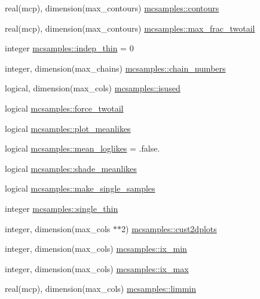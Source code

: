 \begin{DoxyCompactItemize}
real(mcp), dimension(max\+\_\+contours) \mbox{\hyperlink{namespacemcsamples_ae745525f8fef6e02d22826cd2a5f1bcc}{mcsamples\+::contours}}
\item 
real(mcp), dimension(max\+\_\+contours) \mbox{\hyperlink{namespacemcsamples_a1db866dfd553051fc5cbd2c80bcd4c86}{mcsamples\+::max\+\_\+frac\+\_\+twotail}}
\item 
integer \mbox{\hyperlink{namespacemcsamples_a562ce4b67831be4911c45a4e08a6ef18}{mcsamples\+::indep\+\_\+thin}} = 0
\item 
integer, dimension(max\+\_\+chains) \mbox{\hyperlink{namespacemcsamples_a619b6da70c38ede6a9851a3ee89b4019}{mcsamples\+::chain\+\_\+numbers}}
\item 
logical, dimension(max\+\_\+cols) \mbox{\hyperlink{namespacemcsamples_a6269903cd9674bdcc7c4527acdddfef3}{mcsamples\+::isused}}
\item 
logical \mbox{\hyperlink{namespacemcsamples_a5bf85772fb62752a789a1d253bd6cd5a}{mcsamples\+::force\+\_\+twotail}}
\item 
logical \mbox{\hyperlink{namespacemcsamples_a68c0597751197a26086066ed961e47ef}{mcsamples\+::plot\+\_\+meanlikes}}
\item 
logical \mbox{\hyperlink{namespacemcsamples_a42f921b7349e79466c2128ebcb06e75f}{mcsamples\+::mean\+\_\+loglikes}} = .false.
\item 
logical \mbox{\hyperlink{namespacemcsamples_ad55967ca18b8319069920d6d1e772bb1}{mcsamples\+::shade\+\_\+meanlikes}}
\item 
logical \mbox{\hyperlink{namespacemcsamples_ad8e59e2a5de71cff7f1241b59b058291}{mcsamples\+::make\+\_\+single\+\_\+samples}}
\item 
integer \mbox{\hyperlink{namespacemcsamples_a39de2461adb48b31033a95a7d14666be}{mcsamples\+::single\+\_\+thin}}
\item 
integer, dimension(max\+\_\+cols $\ast$$\ast$2) \mbox{\hyperlink{namespacemcsamples_a1831bdf8091941b6ccbd0c3fc3df90f9}{mcsamples\+::cust2dplots}}
\item 
integer, dimension(max\+\_\+cols) \mbox{\hyperlink{namespacemcsamples_a782e4892c659b02c05a3134ad4c32bac}{mcsamples\+::ix\+\_\+min}}
\item 
integer, dimension(max\+\_\+cols) \mbox{\hyperlink{namespacemcsamples_a6a48f0fe15a7b6bfe99092a09e22a218}{mcsamples\+::ix\+\_\+max}}
\item 
real(mcp), dimension(max\+\_\+cols) \mbox{\hyperlink{namespacemcsamples_a299522989433c1f723f9028e5f0460f9}{mcsamples\+::limmin}}
\item 
$$
\end{DoxyCompactItemize}
